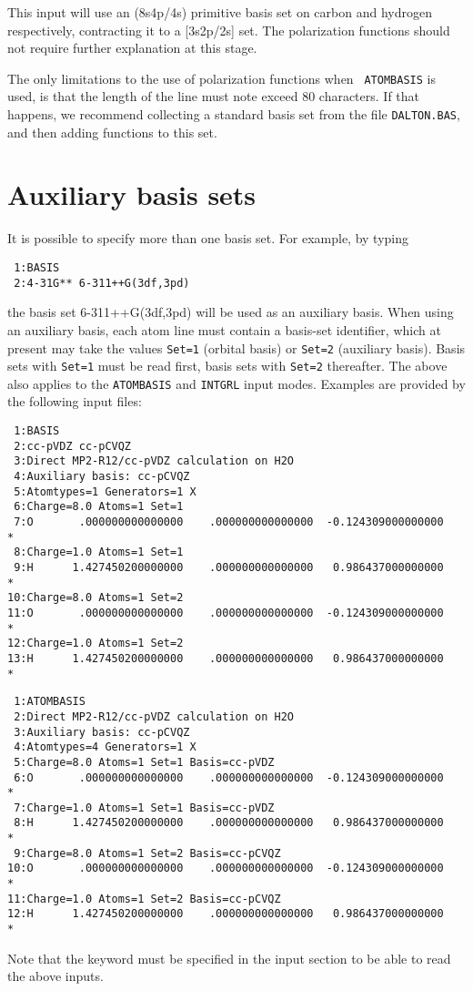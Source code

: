 This input will use an (8s4p/4s) primitive basis set on carbon and
hydrogen respectively, contracting it to a [3s2p/2s] set. The
polarization functions should not require further explanation at this
stage.

The only limitations to the use of polarization functions when {\tt
ATOMBASIS} is used, is that the length of the line must note exceed 80
characters. If that happens, we recommend collecting a standard basis set
from the file \verb|DALTON.BAS|, and then adding
functions to this set.

\section{Auxiliary basis sets}
\label{sec:r12aux}

It is possible to specify more than one basis set. For example, by typing
\begin{verbatim}
 1:BASIS
 2:4-31G** 6-311++G(3df,3pd)
\end{verbatim}
the basis set 6-311++G(3df,3pd) will be used as an auxiliary basis.
When using an auxiliary basis, each atom line must contain a basis-set
identifier, which at present may take the values \verb|Set=1| (orbital basis) or 
\verb|Set=2| (auxiliary basis). Basis sets with \verb|Set=1| must be read first,
basis sets with \verb|Set=2| thereafter.
The above also applies to the \verb|ATOMBASIS| and \verb|INTGRL| input modes.
Examples are provided by the following input files:
\begin{verbatim}
 1:BASIS
 2:cc-pVDZ cc-pCVQZ
 3:Direct MP2-R12/cc-pVDZ calculation on H2O
 4:Auxiliary basis: cc-pCVQZ
 5:Atomtypes=1 Generators=1 X
 6:Charge=8.0 Atoms=1 Set=1
 7:O       .000000000000000    .000000000000000  -0.124309000000000       *
 8:Charge=1.0 Atoms=1 Set=1
 9:H      1.427450200000000    .000000000000000   0.986437000000000       *
10:Charge=8.0 Atoms=1 Set=2
11:O       .000000000000000    .000000000000000  -0.124309000000000       *
12:Charge=1.0 Atoms=1 Set=2
13:H      1.427450200000000    .000000000000000   0.986437000000000       *
\end{verbatim}
\begin{verbatim}
 1:ATOMBASIS
 2:Direct MP2-R12/cc-pVDZ calculation on H2O
 3:Auxiliary basis: cc-pCVQZ
 4:Atomtypes=4 Generators=1 X
 5:Charge=8.0 Atoms=1 Set=1 Basis=cc-pVDZ
 6:O       .000000000000000    .000000000000000  -0.124309000000000       *
 7:Charge=1.0 Atoms=1 Set=1 Basis=cc-pVDZ
 8:H      1.427450200000000    .000000000000000   0.986437000000000       *
 9:Charge=8.0 Atoms=1 Set=2 Basis=cc-pCVQZ
10:O       .000000000000000    .000000000000000  -0.124309000000000       *
11:Charge=1.0 Atoms=1 Set=2 Basis=cc-pCVQZ
12:H      1.427450200000000    .000000000000000   0.986437000000000       *
\end{verbatim}
Note that the keyword  must be specified in the 
 input section to be able to read the above inputs.

